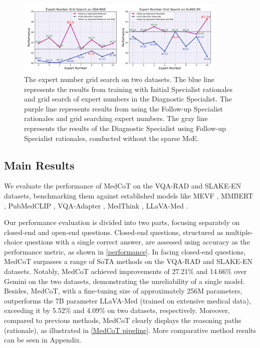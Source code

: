 \documentclass[11pt]{article}
\begin{document}
\begin{figure}
\centering
\includegraphics[width=0.9\textwidth]{image/zhexiantu_all_v6.pdf}
\caption{The expert number grid search on two datasets. The blue line represents the results from training with Initial Specialist rationales and grid search of expert numbers in the Diagnostic Specialist. The purple line represents results from using the Follow-up Specialist rationales and grid searching expert numbers. 
The gray line represents the results of the Diagnostic Specialist using Follow-up Specialist rationales, conducted without the sparse MoE.
} 
\label{zhexiantu-all}
\vspace{-1em}
\end{figure}



\subsection{Main Results}
We evaluate the performance of MedCoT on the VQA-RAD and SLAKE-EN datasets, benchmarking them against established models like MEVF \cite{nguyen2019overcoming}, MMBERT \cite{tiong-etal-2022-plug}, PubMedCLIP \cite{eslami-etal-2023-pubmedclip}, VQA-Adapter \cite{liu2023parameter}, MedThink \cite{gai2024medthink}, LLaVA-Med \cite{li2024llava}. 

Our performance evaluation is divided into two parts, focusing separately on closed-end and open-end questions. Closed-end questions, structured as multiple-choice questions with a single correct answer, are assessed using accuracy as the performance metric, as shown in \autoref{performance}.
In facing closed-end questions, 
MedCoT surpasses a range of SoTA methods on the VQA-RAD and SLAKE-EN datasets. Notably, MedCoT achieved improvements of 27.21\% and 14.66\% over Gemini on the two datasets, demonstrating the unreliability of a single model. Besides, MedCoT, with a fine-tuning size of approximately 256M parameters, outperforms the 7B parameter LLaVA-Med (trained on extensive medical data), exceeding it by 5.52\% and 4.09\% on two datasets, respectively. Moreover, compared to previous methods, MedCoT clearly displays the reasoning paths (rationale), as illustrated in \autoref{MedCoT pipeline}.
More comparative method results can be seen in  Appendix.
\end{document}

